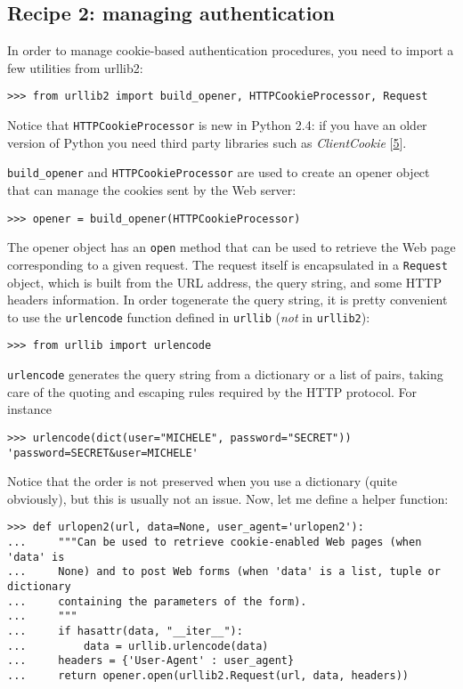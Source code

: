 \documentclass[10pt,a4paper,english]{article}
\newcommand{\titlereference}[1]{\textsl{#1}}
\begin{document}

\hypertarget{recipe-2-managing-authentication}{}
\subsection*{Recipe 2: managing authentication}

In order to manage cookie-based authentication procedures, 
you need to import a few utilities from urllib2:
\begin{verbatim}>>> from urllib2 import build_opener, HTTPCookieProcessor, Request\end{verbatim}

Notice that \texttt{HTTPCookieProcessor} is new in Python 2.4: if you have
an older version of Python you need third party libraries
such as \titlereference{ClientCookie} [\hyperlink{id15}{5}].

\texttt{build{\_}opener} and \texttt{HTTPCookieProcessor} are used to create an opener 
object that can manage the cookies sent by the Web server:
\begin{verbatim}>>> opener = build_opener(HTTPCookieProcessor)\end{verbatim}

The opener object has an \texttt{open} method that can be used to retrieve
the Web page corresponding to a given request. The request itself is
encapsulated in a \texttt{Request} object, which is built from the
URL address, the query string, and some HTTP headers information.
In order togenerate the query string, it is pretty convenient
to use the \texttt{urlencode} function defined in \texttt{urllib} (\emph{not} in \texttt{urllib2}):
\begin{verbatim}>>> from urllib import urlencode\end{verbatim}

\texttt{urlencode} generates the query string from a dictionary
or a list of pairs, taking care of the quoting and escaping
rules required by the HTTP protocol. For instance
\begin{verbatim}>>> urlencode(dict(user="MICHELE", password="SECRET"))
'password=SECRET&user=MICHELE'\end{verbatim}

Notice that the order is not preserved when you use a dictionary 
(quite obviously), but this is usually
not an issue. Now, let me define a helper function:
\begin{verbatim}>>> def urlopen2(url, data=None, user_agent='urlopen2'): 
...     """Can be used to retrieve cookie-enabled Web pages (when 'data' is
...     None) and to post Web forms (when 'data' is a list, tuple or dictionary
...     containing the parameters of the form).
...     """
...     if hasattr(data, "__iter__"):
...         data = urllib.urlencode(data)
...     headers = {'User-Agent' : user_agent}
...     return opener.open(urllib2.Request(url, data, headers))\end{verbatim}
\end{document}
